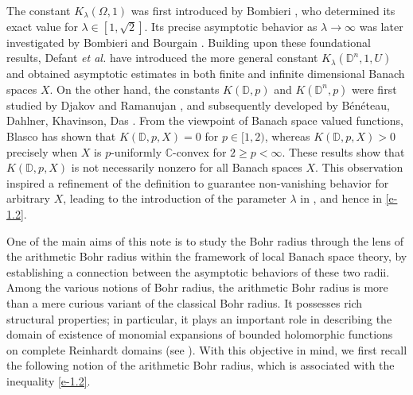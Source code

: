 \documentclass[a4paper,11pt, reqno]{amsart}
\theoremstyle{definition}
\newcounter {own}
\begin{document}
		The constant $K_{\lambda}(\Omega, 1)$ was first introduced by Bombieri \cite{bombieri-1962}, who determined its exact value for $\lambda \in [1,\sqrt{2}]$. Its precise asymptotic behavior as $\lambda\rightarrow \infty$ was later investigated by Bombieri and Bourgain \cite{bombieri-2004}. Building upon these foundational results,  Defant {\it et al.} \cite{defant-2012} have introduced the more general constant $K_\lambda(\mathbb{D}^n,1,U)$ and obtained asymptotic estimates in both finite and infinite dimensional Banach spaces $X$. On the other hand, the constants $K(\mathbb{D},p)$ and $K(\mathbb{D}^n,p)$ were first studied by Djakov and Ramanujan \cite{Djakov & Ramanujan & J. Anal & 2000}, and subsequently developed by B\'{e}n\'{e}teau, Dahlner, Khavinson, Das \cite{bene-2004}. From the viewpoint of Banach space valued functions, Blasco \cite{Blasco-Collect-2017} has shown that $K(\mathbb{D},p,X)=0$ for $p \in [1,2)$, whereas  $K(\mathbb{D},p,X)>0$ precisely when $X$ is $p$-uniformly $\mathbb{C}$-convex for $2 \geq p < \infty$. 
	These results show that $K(\mathbb{D},p,X)$ is not necessarily nonzero for all Banach spaces $X$. This observation inspired a refinement of the definition to guarantee non-vanishing behavior for arbitrary $X$, leading to the introduction of the parameter $\lambda$ in \cite[Definition 1.1]{defant-2012}, and hence in \eqref{e-1.2}.
	\vspace{2mm}
	
	One of the main aims of this note is to study the Bohr radius through the lens of the arithmetic Bohr radius within the framework of local Banach space theory, by establishing a connection between the asymptotic behaviors of these two radii. Among the various notions of Bohr radius, the arithmetic Bohr radius is more than a mere curious variant of the classical Bohr radius. It possesses rich structural properties; in particular, it plays an important role in describing the domain of existence of monomial expansions of bounded holomorphic functions on complete Reinhardt domains (see \cite{prengel-2005}). With this objective in mind, we first recall the following notion of the arithmetic Bohr radius, which is associated with the inequality \eqref{e-1.2}.
	\vspace{2mm}
	
\end{document}
